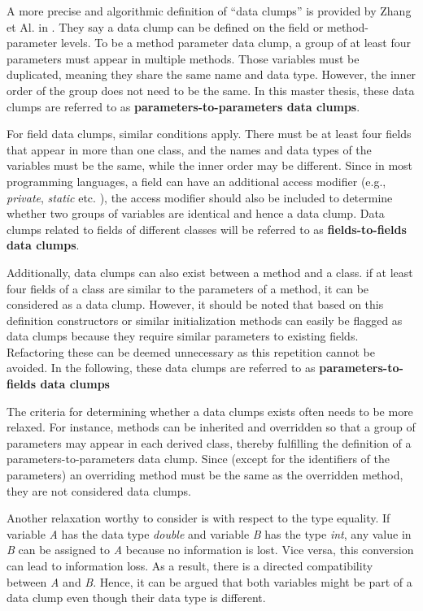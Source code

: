 A more precise and algorithmic definition of \enquote{data clumps} is provided by Zhang et Al. in  \cite{zhangImprovingPrecisionFowler2008}. They say a data clump can be defined on the field or method-parameter levels. 
To be a method parameter data clump, a group of at least four parameters must appear in multiple methods. Those variables must be duplicated, meaning they share the same name and data type. However, the inner order of the group does not need to be the same. In this master thesis, these data clumps are referred to as \textbf{parameters-to-parameters data clumps}.

For field data clumps, similar conditions apply. There must be at least four fields that appear in more than one class, and the names and data types of the variables must be the same, while the inner order may be different. Since in most programming languages, a field can have an additional access modifier (e.g., \textit{private}, \textit{static} etc. ), the access modifier should also be included to determine whether two groups of variables are identical and hence a data clump.  Data clumps related to fields of different classes will be referred to as \textbf{fields-to-fields data clumps}.

Additionally, data clumps can also exist between a method and a class. if at least four fields of a class are similar to the parameters of a method, it can be considered as a data clump. However, it should be noted that based on this definition constructors or similar initialization methods can easily be flagged as data clumps because they require similar parameters to existing fields. Refactoring these can be deemed unnecessary as this repetition cannot be avoided. 
 In the following, these data clumps are referred to as \textbf{parameters-to-fields data clumps}


The criteria for determining whether a data clumps exists often needs to be more relaxed. For instance, methods can be inherited and overridden so that a group of parameters may appear in each derived class, thereby fulfilling the definition of a  parameters-to-parameters data clump. Since (except for the identifiers of the parameters) an overriding method must be the same as the overridden method, they are not considered data clumps.


Another relaxation worthy to consider is with respect to the type equality. If variable \textit{A} has the data type \textit{double} and variable \textit{B} has the type \textit{int}, any value in \textit{B} can be assigned to \textit{A} because no information is lost. Vice versa, this conversion can lead to information loss. As a result, there is a directed compatibility between \textit{A} and \textit{B}. Hence, it can be argued that both variables might be part of a data clump even though their data type is different. 


